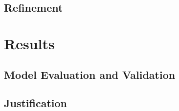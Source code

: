 \documentclass[12pt,a4paper]{article}
\begin{document}
\subsection*{Refinement}
%
%
\section{Results}
%
\subsection*{Model Evaluation and Validation}
%
\subsection*{Justification}
%
%
\end{document}

